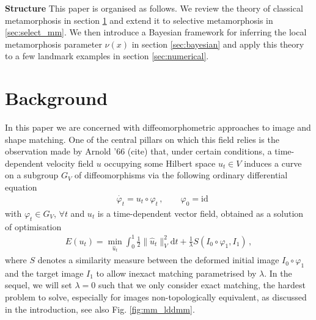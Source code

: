 \documentclass[runningheads]{llncs}
\newcommand{\half}{\frac 12}
\newcommand{\norm}[2]{\| #1 \|_{ #2 }}
\newcommand{\vnorm}[1]{\norm{ #1 }{V}}
\newcommand{\diff}[1]{\text{d} #1}
\begin{document}
{\bf Structure} This paper is organised as follows. We review the theory of classical metamorphosis in section
\ref{sec:bg} and extend it to selective metamorphosis in \ref{sec:select_mm}. 
We then introduce a Bayesian framework for inferring the local metamorphosis parameter $\nu(x)$ in section \ref{sec:bayesian} and apply this theory to a few landmark examples in section \ref{sec:numerical}.

\section{Background}\label{sec:bg}

In this paper we are concerned with diffeomorphometric approaches to image and
shape matching. One of the central pillars on which this field relies is the
observation made by Arnold '66 (cite) that, under certain conditions, a
time-dependent velocity field $u$ occupying some Hilbert space $u_t \in V$
induces a curve on a subgroup $G_V$ of diffeomorphisms \cite{younes2010shapes}
via the following ordinary differential
equation
\begin{align}
& \dot{\varphi_t} = u_t \circ \varphi_t\, , \qquad  \varphi_0 = \text{id}
  \label{diffeo}
\end{align}
with $\varphi_t \in G_V$, $\forall t$ and $u_t$ is a time-dependent vector field, obtained as a solution of optimisation  
\begin{align}
  E(u_t) = \min_{\hat u_t} \int_0^1 \half\vnorm{\hat u_t}^2 \diff{t} + \frac{1}{\lambda} S(I_0\circ\varphi_1, I_1)\, , 
  \label{E-def}
\end{align}
where $S$ denotes a similarity measure between the deformed initial image $I_0\circ \varphi_1$ and the target image $I_1$ to allow inexact matching parametrised by $\lambda$.  
In the sequel, we will set $\lambda=0$ such that we only consider exact matching, the hardest problem to solve, especially for images non-topologically equivalent, as discussed in the introduction, see also Fig. \ref{fig:mm_lddmm}.




\end{document}
